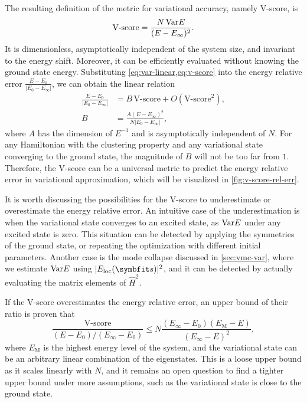 The resulting definition of the metric for variational accuracy, namely V-score, is
\begin{equation}
\text{V-score} = \frac{N\,\mathrm{Var} E}{(E - E_\infty)^2}.
\label{eq:v-score}
\end{equation}
It is dimensionless, asymptotically independent of the system size, and invariant to the energy shift. Moreover, it can be efficiently evaluated without knowing the ground state energy. Substituting \cref{eq:var-linear,eq:v-score} into the energy relative error $\frac{E - E_0}{|E_0 - E_\infty|}$, we can obtain the linear relation
\begin{align}
\frac{E - E_0}{|E_0 - E_\infty|} &= B\,\text{V-score} + O(\text{V-score}^2), \label{eq:v-score-rel-err} \\
B &= \frac{A (E - E_\infty)^2}{N |E_0 - E_\infty|},
\end{align}
where $A$ has the dimension of $E^{-1}$ and is asymptotically independent of $N$. For any Hamiltonian with the clustering property and any variational state converging to the ground state, the magnitude of $B$ will not be too far from $1$. Therefore, the V-score can be a universal metric to predict the energy relative error in variational approximation, which will be visualized in \cref{fig:v-score-rel-err}.

It is worth discussing the possibilities for the V-score to underestimate or overestimate the energy relative error. An intuitive case of the underestimation is when the variational state converges to an excited state, as $\mathrm{Var} E$ under any excited state is zero. This situation can be detected by applying the symmetries of the ground state, or repeating the optimization with different initial parameters. Another case is the mode collapse discussed in \cref{sec:vmc-var}, where we estimate $\mathrm{Var} E$ using $|E_\text{loc}(\vs)|^2$, and it can be detected by actually evaluating the matrix elements of $\hat{H}^2$.

If the V-score overestimates the energy relative error, an upper bound of their ratio is proven that
\begin{equation}
\frac{\text{V-score}}{(E - E_0) / (E_\infty - E_0)} \le N \frac{(E_\infty - E_0) (E_\text{M} - E)}{(E_\infty - E)^2},
\label{eq:v-score-bound}
\end{equation}
where $E_\text{M}$ is the highest energy level of the system, and the variational state can be an arbitrary linear combination of the eigenstates. This is a loose upper bound as it scales linearly with $N$, and it remains an open question to find a tighter upper bound under more assumptions, such as the variational state is close to the ground state.

